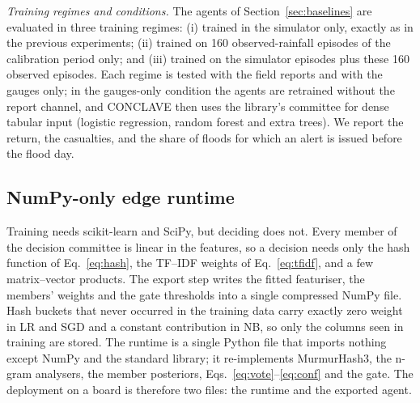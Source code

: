 \documentclass[journal]{IEEEtran}
\begin{document}
\textit{Training regimes and conditions.} The agents of
Section~\ref{sec:baselines} are evaluated in three training regimes: (i)
trained in the simulator only, exactly as in the previous experiments; (ii)
trained on 160 observed-rainfall episodes of the calibration period only; and
(iii) trained on the simulator episodes plus these 160 observed episodes.
Each regime is tested with the field reports and with the gauges only; in the
gauges-only condition the agents are retrained without the report channel,
and CONCLAVE then uses the library's committee for dense tabular input
(logistic regression, random forest and extra trees). We report the return,
the casualties, and the share of floods for which an alert is issued before
the flood day.

\subsection{NumPy-only edge runtime}\label{sec:runtime}
Training needs scikit-learn and SciPy, but deciding does not. Every member of
the decision committee is linear in the features, so a decision needs only the
hash function of Eq.~\eqref{eq:hash}, the TF--IDF weights of
Eq.~\eqref{eq:tfidf}, and a few matrix--vector products. The export step
writes the fitted featuriser, the members' weights and the gate thresholds
into a single compressed NumPy file. Hash buckets that never occurred in the
training data carry exactly zero weight in LR and SGD and a constant
contribution in NB, so only the columns seen in training are stored. The
runtime is a single Python file that imports nothing except NumPy and the
standard library; it re-implements MurmurHash3, the n-gram analysers, the
member posteriors, Eqs.~\eqref{eq:vote}--\eqref{eq:conf} and the gate. The
deployment on a board is therefore two files: the runtime and the exported
agent.
\end{document}
